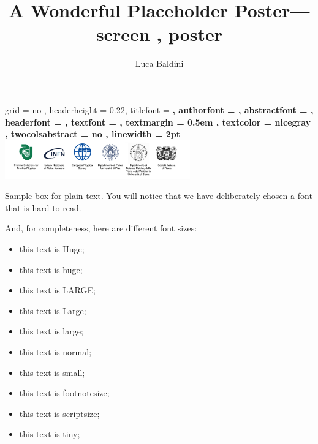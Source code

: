 \documentclass[portrait,final]{pmposter}
\title{A Wonderful Placeholder Poster---screen \screenid{}, poster \posterid}
\author{Luca Baldini}
\affil{Universit\`a and INFN-Pisa}
\begin{document}
\begin{poster}
  { %
    grid            = no             , %
    headerheight    = 0.22\textheight, %
    titlefont       = \bf\huge       , %
    authorfont      = \large         , %
    abstractfont    = \large         , %
    headerfont      = \bf\Large      , %
    textfont        = \normalsize    , %
    textmargin      = 0.5em          , %
    textcolor       = nicegray           , %
    twocolsabstract = no             , %
    linewidth       = 2pt              %
  }
  { %
    \includegraphics[width=0.6\textwidth]{fdfp}
  }
  {}




  {
    Sample box for plain text. You will notice that we have deliberately chosen
    a font that is hard to read.

    \bigskip

    And, for completeness, here are different font sizes:
    \begin{itemize}
    \item {\Huge this text is Huge;}
    \item {\huge this text is huge;}
    \item {\LARGE this text is LARGE;}
    \item {\Large this text is Large;}
    \item {\large this text is large;}
    \item this text is normal;
    \item {\small this text is small;}
    \item {\footnotesize this text is footnotesize;}
    \item {\scriptsize this text is scriptsize;}
    \item {\tiny this text is tiny;}
    \end{itemize}

}
\end{poster}
\end{document}
